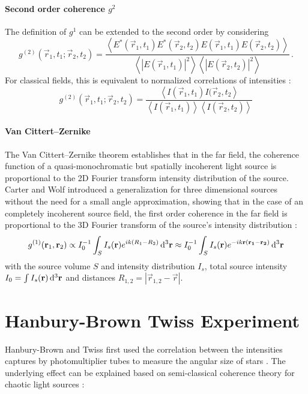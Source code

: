 \paragraph{Second order coherence $g^2$}
The definition of $g^1$ can be extended to the second order by considering
\begin{equation}
	g^{(2)}(\vec{r}_1,t_1;\vec{r}_2,t_2)= 
	\frac{\left< E^*(\vec{r}_1,t_1)E^*(\vec{r}_2,t_2)E(\vec{r}_1,t_1)E(\vec{r}_2,t_2) \right>}{\left<\left | E(\vec{r}_1,t_1)\right |^2 \right> \left< \left |E(\vec{r}_2,t_2)\right |^2 \right>} \,.	
\end{equation}
For classical fields, this is equivalent  to normalized correlations of intensities \cite{goodman2000}:
\begin{equation}
	g^{(2)}(\vec{r}_1,t_1;\vec{r}_2,t_2)= 
		\frac{\left< I(\vec{r}_1,t_1)I(\vec{r}_2,t_2 \right>}{\left<I(\vec{r}_1,t_1)\right>\left<I(\vec{r}_2,t_2)\right>}	
		\label{eq:g2}
\end{equation}


\paragraph{Van Cittert–Zernike}
The Van Cittert–Zernike theorem establishes that in the far field, the coherence function of a 
quasi-monochromatic but spatially incoherent light source is proportional to the 2D Fourier transform intensity distribution of the source. Carter and Wolf introduced a generalization for three dimensional sources without the need for a small angle approximation, showing that in the case of an completely incoherent source field, the first order coherence in the far field is proportional to the 3D Fourier transform of the source's intensity distribution \cite{rosen1996, goodman2005, carter1981}:
\begin{equation}
	g^{(1)}(\mathbf{r}_1,\mathbf{r}_2) \propto I_0^{-1} \int_{S} I_s(\mathbf{r}) e^{ik(R_1-R_2)} \operatorname{\mathrm{d}^3 \!} \mathbf{r} \approx I_0^{-1} \int_{S} I_s(\mathbf{r}) e^{-ik\mathbf{r}(\mathbf{r_1}-\mathbf{r_2})} \operatorname{\mathrm{d}^3 \!} \mathbf{r}
	\label{eq:vcz}
\end{equation}
with the source volume $S$ and intensity distribution $I_s$, total source intensity $I_0=\int I_s(\mathbf{r}) \operatorname{\mathrm{d}^3 \!} \mathbf{r}$ and distances $R_{1,2}=\left|\vec{r}_{1,2}-\vec{r}\right|$.


\section{Hanbury-Brown Twiss Experiment}
Hanbury-Brown and Twiss first used the correlation between the intensities captures by photomultiplier tubes to measure the angular size of stars  \cite{hanbury1956}. The underlying effect can be explained based on semi-classical coherence theory for chaotic light sources \cite{baym1997,goodman2000}:

